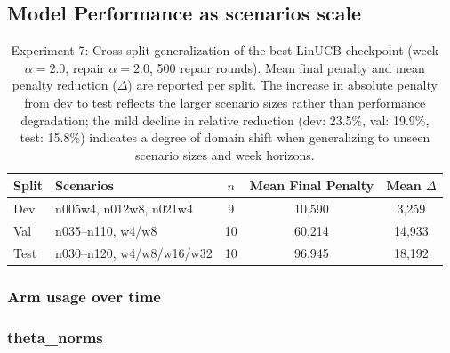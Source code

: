 \documentclass[11pt]{article}
\begin{document}
\subsection{Model Performance as scenarios scale}

\begin{table}[h]
\centering
\begin{tabular}{llccc}                                                                                                          
\toprule
\textbf{Split} & \textbf{Scenarios} & \textbf{$n$} & \textbf{Mean Final Penalty} & \textbf{Mean $\Delta$} \\                                                                                              
\midrule                                                                                                                      
Dev  & n005w4, n012w8, n021w4       & 9  & 10,590 & 3,259  \\
Val  & n035--n110, w4/w8            & 10 & 60,214 & 14,933 \\ 
Test & n030--n120, w4/w8/w16/w32    & 10 & 96,945 & 18,192 \\
\bottomrule                                                           \end{tabular}          

\caption{Experiment 7: Cross-split generalization of the best LinUCB checkpoint (week $\alpha=2.0$, repair $\alpha=2.0$, 500 repair rounds). Mean final penalty and mean penalty reduction ($\Delta$) are 
reported per split. The increase in absolute penalty from dev to test reflects the larger scenario sizes rather than performance degradation; the mild decline in relative reduction (dev: 23.5\%, val:   
19.9\%, test: 15.8\%) indicates a degree of domain shift when generalizing to unseen scenario sizes and week horizons.}
\label{tab:exp7_generalization}                                                                                                                                                                     
\end{table}
\subsubsection{Arm usage over time}

\subsubsection{theta_norms}


\end{document}
